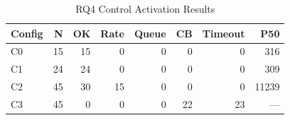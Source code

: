 \begin{table}[htbp]
\caption{RQ4 Control Activation Results}
\label{tab:rq4-controls}
\centering\small
\begin{tabular}{lrrrrrrr}
\toprule
\textbf{Config} & \textbf{N} & \textbf{OK} & \textbf{Rate} & \textbf{Queue} & \textbf{CB} & \textbf{Timeout} & \textbf{P50} \\
\midrule
  C0 & 15 & 15 & 0 & 0 & 0 & 0 & 316 \\
  C1 & 24 & 24 & 0 & 0 & 0 & 0 & 309 \\
  C2 & 45 & 30 & 15 & 0 & 0 & 0 & 11239 \\
  C3 & 45 & 0 & 0 & 0 & 22 & 23 & --- \\
\bottomrule
\end{tabular}
\end{table}